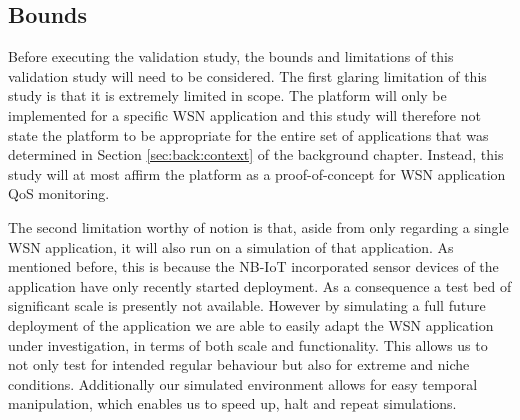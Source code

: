
\subsection{Bounds}
Before executing the validation study, the bounds and limitations of this validation study will need to be considered. The first glaring limitation of this study is that it is extremely limited in scope. The platform will only be implemented for a specific WSN application and this study will therefore not state the platform to be appropriate for the entire set of applications that was determined in Section \ref{sec:back:context} of the background chapter. Instead, this study will at most affirm the platform as a proof-of-concept for WSN application QoS monitoring.

The second limitation worthy of notion is that, aside from only regarding a single WSN application, it will also run on a simulation of that application. As mentioned before, this is because the NB-IoT incorporated sensor devices of the \sensit application have only recently started deployment. As a consequence a test bed of significant scale is presently not available. However by simulating a full future deployment of the application we are able to easily adapt the WSN application under investigation, in terms of both scale and functionality. This allows us to not only test for intended regular behaviour but also for extreme and niche conditions. Additionally our simulated environment allows for easy temporal manipulation, which enables us to speed up, halt and repeat simulations.

